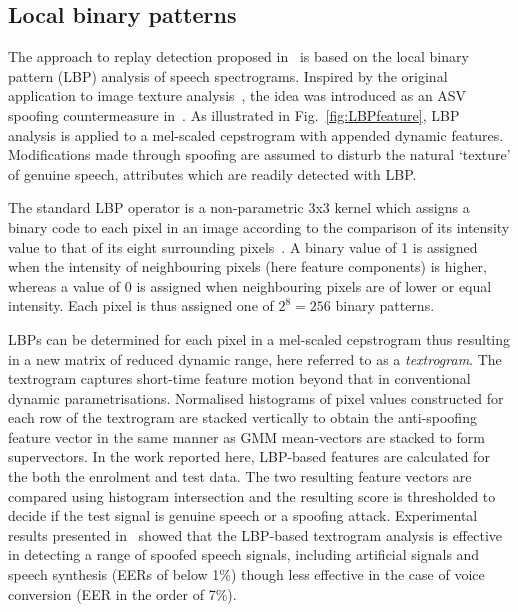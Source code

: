 \subsection{Local binary patterns}


The approach to replay detection proposed in~\cite{Alegre2014} is based on the local binary pattern (LBP) analysis of speech spectrograms.  
Inspired by the original application to image texture analysis~\cite{Ojala2002}, the idea was introduced as an ASV spoofing countermeasure in~\cite{Alegre2013a}.  
As illustrated in Fig.~\ref{fig:LBPfeature}, LBP analysis is applied to a mel-scaled cepstrogram with appended dynamic features.  Modifications made through spoofing are assumed to disturb the natural `texture' of genuine speech, attributes which are readily detected with LBP.   

The standard LBP operator is a non-parametric 3x3 kernel which assigns a binary code to each pixel in an image according to the comparison of its intensity value to that of its eight surrounding pixels~\cite{Ojala2002}. 
A binary value of 1 is assigned when the intensity of neighbouring pixels (here feature components) is higher, whereas a value of 0 is assigned when neighbouring pixels are of lower or equal intensity. Each pixel is thus assigned one of $2^8=256$ binary patterns.

LBPs can be determined for each pixel in a mel-scaled cepstrogram thus resulting in a new matrix of reduced dynamic range, here referred to as a \emph{textrogram}.  
The textrogram captures short-time feature motion beyond that in conventional dynamic parametrisations.  
Normalised histograms of pixel values constructed for each row of the textrogram   are stacked vertically to obtain the anti-spoofing feature vector in the same manner as GMM mean-vectors are stacked to form supervectors.  
In the work reported here, LBP-based features are calculated for the both the enrolment and test data.  The two resulting feature vectors are compared using histogram intersection and the resulting score is thresholded to decide if the test signal is genuine speech or a spoofing attack.
Experimental results presented in~\cite{Alegre2013a} showed that the LBP-based textrogram analysis is effective in detecting a range of spoofed speech signals, including artificial signals and speech synthesis (EERs of below 1\%) though less effective in the case of voice conversion (EER in the order of 7\%).




